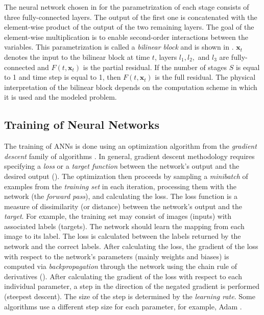 The neural network chosen in \cite{Ouala2019}
for the parametrization of each stage consists of three fully-connected layers. The output of the first one is concatenated with the element-wise product of the output of the two remaining layers. The goal of the element-wise multiplication is to enable second-order interactions between the variables. This parametrization is called a \emph{bilinear block} \cite{Fablet2017} and is shown in . $\pmb{x}_t$ denotes the input to the bilinear block at time $t$, layers $l_1, l_2,$ and $l_3$ are fully-connected and $F(t, \pmb{x}_t)$ is the partial residual. If the number of stages $S$ is equal to 1 and time step is equal to 1, then $F(t, \pmb{x}_t)$ is the full residual. The physical interpretation of the bilinear block depends on the computation scheme in which it is used and the modeled problem.



\subsection{Training of Neural Networks}

The training of \acp{ANN} is done using an optimization algorithm from the \emph{gradient descent} family of algorithms \cite{Goodfellow-et-al-2016}. In general, gradient descent methodology requires specifying a \emph{loss} or a \emph{target function} between the network's output and the desired output (). The optimization then proceeds by sampling a \emph{minibatch} of examples from the \emph{training set} in each iteration, processing them with the network (the \emph{forward pass}), and calculating the loss. The loss function is a measure of dissimilarity (or distance) between the network's output and the \emph{target}. For example, the training set may consist of images (inputs) with associated labels (targets). The network should learn the mapping from each image to its label. The loss is calculated between the labels returned by the network and the correct labels. After calculating the loss, the gradient of the loss with respect to the network's parameters (mainly weights and biases) is computed via \emph{backpropagation} through the network using the chain rule of derivatives (). After calculating the gradient of the loss with respect to each individual parameter, a step in the direction of the negated gradient is performed (steepest descent). The size of the step is determined by the \emph{learning rate}. Some algorithms use a different step size for each parameter, for example, Adam \cite{Kingma2017}.

